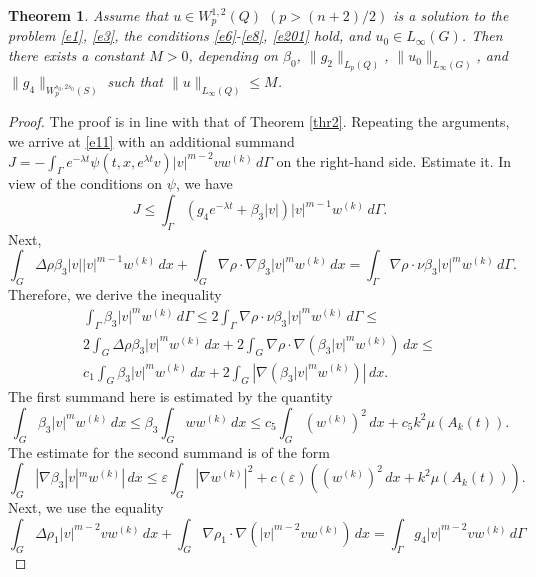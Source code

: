 \documentclass{article}
\theoremstyle{plain}
\newtheorem{theorem}{Theorem}
\begin{document}
\begin{theorem} \label{thr3}
 Assume that  $u\in W_p^{1,2}(Q)$ $(p>(n+2)/2)$ is a solution to the problem  {\rm \eqref{e1}, \eqref{e3}}, the conditions 
   {\rm \eqref{e6}-\eqref{e8}, \eqref{e201}} hold, and    $u_0\in L_\infty(G)$. 
Then there exists a constant  $M>0$, depending on  $\beta_0$,  $\|g_2\|_{L_{p}(Q)}$,  $\|u_0\|_{L_\infty(G)}$, and
$\|g_4\|_{W_p^{s_0,2s_0}(S)}$ such that 
 $\|u\|_{L_\infty(Q)}\leq M$. 
    \end{theorem}
\begin{proof}
The proof is in line with that of Theorem \ref{thr2}. Repeating the arguments, we arrive at \eqref{e11} with an additional  summand $J= -\int_{\Gamma}e^{-\lambda t} \psi(t,x,e^{\lambda t}v) |v|^{m-2}v w^{(k)}\,d\Gamma$  on the right-hand side. Estimate it.   
In view of the conditions on  $\psi$, we have 
$$
J\leq \int_\Gamma (g_4e^{-\lambda t}+\beta_3|v|)|v|^{m-1}w^{(k)}\,d\Gamma.
$$
 Next, 
\begin{equation*}
\int_G \Delta\rho \beta_3|v| |v|^{m-1}w^{(k)}\,dx + \int_G \nabla \rho \cdot\nabla \beta_3|v|^{m}w^{(k)}\,dx= \int_{\Gamma}\nabla \rho\cdot \nu 
\beta_3|v|^{m}w^{(k)}\,d\Gamma. 
\end{equation*}
Therefore, we derive the inequality 
\begin{multline*}
 \int_{\Gamma} \beta_3|v|^{m}w^{(k)}\,d\Gamma \leq 
 2\int_{\Gamma}\nabla \rho\cdot \nu \beta_3|v|^{m}w^{(k)}\,d\Gamma\leq  \\
 2\int_G \Delta\rho \beta_3|v|^{m}w^{(k)}\,dx+ 2\int_G \nabla \rho \cdot\nabla (\beta_3|v|^{m}w^{(k)})\,dx\leq \\
c_1 \int_G \beta_3|v|^{m}w^{(k)}\,dx+ 2\int_G |\nabla (\beta_3|v|^{m}w^{(k)})|\,dx.
\end{multline*}
The first summand here is estimated by  the quantity
\begin{equation}\label{w21}
\int_G  \beta_3|v|^{m}w^{(k)}\,dx\leq  \beta_3\int_G w w^{(k)}\,dx\leq c_5\int_G (w^{(k)})^2\,dx+ c_5k^2 \mu(A_k(t)). 
\end{equation}
The estimate for the second summand  is of the form 
\begin{equation}\label{w22}
 \int_G |\nabla \beta_3|v|^{m}w^{(k)}|\,dx\leq  \varepsilon \int_{G} |\nabla w^{(k)}|^2  + c(\varepsilon) ((w^{(k)})^2\,dx +k^2 \mu(A_k(t))).
\end{equation}
Next, we use the equality 
\begin{equation*}
\int_G \Delta\rho_1  |v|^{m-2}v w^{(k)}\,dx+ \int_G \nabla \rho_1 \cdot\nabla (|v|^{m-2}v w^{(k)})\,dx= \int_{\Gamma} g_4 |v|^{m-2} v w^{(k)}\,d\Gamma 

\end{equation*}
\end{proof}
\end{document}
